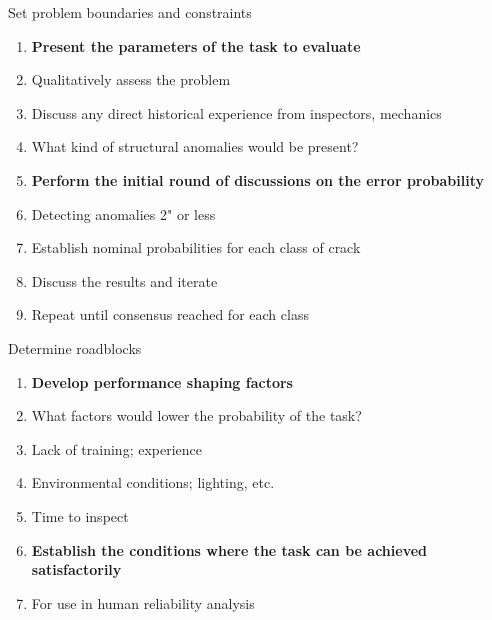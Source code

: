 \documentclass[aspectratio=1610,pdftex,dvipsnames,compress,xcolor={dvipsnames}]{beamer}
\begin{document}
\begin{frame}{Set problem boundaries and constraints}
    \begin{enumerate}[series=outerlist,topsep=0pt,itemsep=1pt,leftmargin=*,label=(\arabic*)]
        \item[]\textbf{Present the parameters of the task to evaluate}
        \item[]Qualitatively assess the problem  
        \item[]Discuss any direct historical experience from inspectors, mechanics  
        \item[]What kind of structural anomalies would be present?  
            \vspace{0.05in}
        \item[]\textbf{Perform the initial round of discussions on the error probability}
        \item[]Detecting anomalies 2" or less  
        \item[]Establish nominal probabilities for each class of crack 
            \vspace{0.15in}
        \item[]Discuss the results and iterate
            \vspace{0.15in}
        \item[]Repeat until consensus reached for each class
    \end{enumerate}
\end{frame}


\begin{frame}{Determine roadblocks}
    \begin{enumerate}[series=outerlist,topsep=0pt,itemsep=3pt,leftmargin=*,label=(\arabic*)]
        \item[]\textbf{Develop performance shaping factors}
        \item[]What factors would lower the probability of the task?  
        \item[]Lack of training; experience  
        \item[]Environmental conditions; lighting, etc.  
        \item[]Time to inspect
            \vspace{0.10in}
        \item[]\textbf{Establish the conditions where the task can be achieved satisfactorily}
            \vspace{0.10in}
        \item[]For use in human reliability analysis
    \end{enumerate}
\end{frame}
\end{document}
